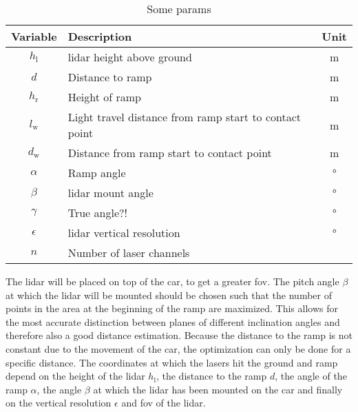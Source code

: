 \begin{table}[htbp]
	\centering
	\caption{Some params}
	\label{tab:lidar_mount}
	\begin{tabular}[t]{clc}
		\toprule
		\textbf{Variable} & \textbf{Description}                                   & \textbf{Unit} \\
		\midrule
		$h_\mathrm{l} $   & \gls{lidar} height above ground                        & \si{\metre}   \\
		$d$               & Distance to ramp                                       & \si{\metre}   \\
		$h_\mathrm{r}$    & Height of ramp                                         & \si{\metre}   \\
		$l_\mathrm{w}$    & Light travel distance from ramp start to contact point & \si{\metre}   \\
		$d_\mathrm{w}$    & Distance from ramp start to contact point              & \si{\metre}   \\
		$\alpha$          & Ramp angle                                             & \si{\degree}  \\
		$\beta$           & \gls{lidar} mount angle                                & \si{\degree}  \\
		$\gamma$          & True angle?!                                           & \si{\degree}  \\
		$\epsilon$        & \gls{lidar} vertical resolution                        & \si{\degree}  \\
		$n$               & Number of laser channels                               &               \\
		\bottomrule
	\end{tabular}
\end{table}
The \gls{lidar} will be placed on top of the car, to get a greater \gls{fov}.
The pitch angle $\beta$ at which the \gls{lidar} will be mounted should be chosen such that the number of points in the area at the beginning of the ramp are maximized.
This allows for the most accurate distinction between planes of different inclination angles and therefore also a good distance estimation.
Because the distance to the ramp is not constant due to the movement of the car, the optimization can only be done for a specific distance.
The coordinates at which the lasers hit the ground and ramp depend on the height of the \gls{lidar} $h_\mathrm{l}$, the distance to the ramp $d$, the angle of the ramp $\alpha$, the angle $\beta$ at which the \gls{lidar} has been mounted on the car and finally on the vertical resolution $\epsilon$ and \gls{fov} of the \gls{lidar}.
